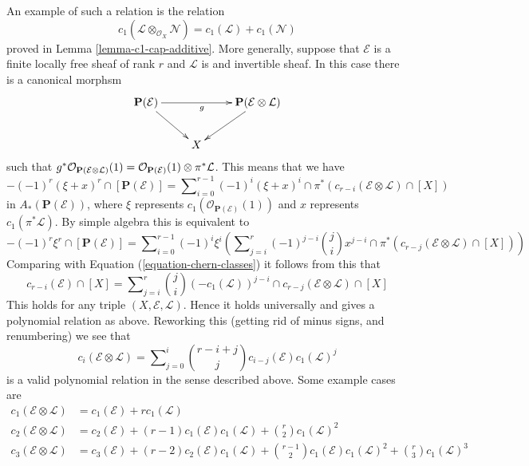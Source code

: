 \medskip\noindent
An example of such a relation is the relation
$$
c_1(\mathcal{L} \otimes_{\mathcal{O}_X} \mathcal{N})
=
c_1(\mathcal{L}) + c_1(\mathcal{N})
$$
proved in Lemma \ref{lemma-c1-cap-additive}. More generally,
suppose that ${\mathcal E}$ is a finite locally free sheaf of
rank $r$ and ${\mathcal L}$ is and invertible sheaf.
In this case there is a canonical morphsm
$$
\xymatrix{
{\bf P}({\mathcal E})\ar[rd] \ar[rr]_g
&
&
{\bf P}({\mathcal E} \otimes \mathcal{L})\ar[ld]
\cr
& X & 
\cr}
$$
such that $g^*{\mathcal O}_{{\bf P}({\mathcal E} \otimes \mathcal{L})}(1) 
= {\mathcal O}_{{\bf P}({\mathcal E})}(1) \otimes \pi^* {\mathcal L}$.
This means that we have
$$
-(-1)^r(\xi + x)^r \cap [\mathbf{P}(\mathcal{E})] =
\sum\nolimits_{i = 0}^{r - 1}
(-1)^i
(\xi + x)^i \cap \pi^*(c_{r - i}(\mathcal{E} \otimes \mathcal{L}) \cap [X])
$$
in $A_*(\mathbf{P}(\mathcal{E}))$, where $\xi$ represents
$c_1(\mathcal{O}_{\mathbf{P}(\mathcal{E})}(1))$ and $x$
represents $c_1(\pi^*\mathcal{L})$. By simple algebra this
is equivalent to
$$
-(-1)^r \xi^r \cap [\mathbf{P}(\mathcal{E})] =
\sum\nolimits_{i = 0}^{r - 1}
(-1)^i \xi^i \left(
\sum\nolimits_{j = i}^r
(-1)^{j - i}
\binom{j}{i}
x^{j - i} \cap
\pi^*(c_{r - j}(\mathcal{E} \otimes \mathcal{L}) \cap [X])
\right)
$$
Comparing with
Equation (\ref{equation-chern-classes}) it follows from this that
$$
c_{r - i}(\mathcal{E}) \cap [X] =
\sum\nolimits_{j = i}^r
\binom{j}{i}
(-c_1(\mathcal{L}))^{j - i} \cap
c_{r - j}(\mathcal{E} \otimes \mathcal{L}) \cap [X]
$$
This holds for any triple $(X, \mathcal{E}, \mathcal{L})$. Hence
it holds universally and gives a polynomial relation as above.
Reworking this (getting rid of minus signs, and renumbering) we see that
\begin{equation}
\label{equation-twist}
c_i({\mathcal E}\otimes {\mathcal L})
=
\sum\nolimits_{j = 0}^i
\binom{r - i + j}{j} c_{i - j}({\mathcal E}) c_1({\mathcal L})^j
\end{equation}
is a valid polynomial relation in the sense described above.
Some example cases are
\begin{align*}
c_1(\mathcal{E} \otimes \mathcal{L})
& =
c_1(\mathcal{E}) +
r c_1(\mathcal{L}) \\
c_2(\mathcal{E} \otimes \mathcal{L})
& =
c_2(\mathcal{E}) +
(r - 1) c_1(\mathcal{E}) c_1(\mathcal{L}) +
\binom{r}{2} c_1(\mathcal{L})^2 \\
c_3(\mathcal{E} \otimes \mathcal{L})
& =
c_3(\mathcal{E}) +
(r - 2) c_2(\mathcal{E})c_1(\mathcal{L}) + 
\binom{r - 1}{2} c_1(\mathcal{E})c_1(\mathcal{L})^2 +
\binom{r}{3} c_1(\mathcal{L})^3
\end{align*}








